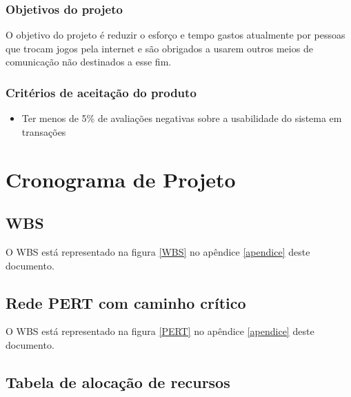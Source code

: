 \documentclass[a4paper,11pt]{article}
\begin{document}
		\subsubsection{Objetivos do projeto}
			O objetivo do projeto é reduzir o esforço e tempo gastos atualmente por pessoas que trocam jogos pela internet e são obrigados a usarem outros meios de comunicação não destinados a esse fim.
			
		\subsubsection{Critérios de aceitação do produto}
			\begin{itemize}
				\item Ter menos de 5\% de avaliações negativas sobre a usabilidade do sistema em transações
			\end{itemize}
	
\section{Cronograma de Projeto}
	\subsection{WBS}
    	O WBS está representado na figura \ref{WBS} no apêndice \ref{apendice} deste documento.
	\subsection{Rede PERT com caminho crítico}
		O WBS está representado na figura \ref{PERT} no apêndice \ref{apendice} deste documento.
	\subsection{Tabela de alocação de recursos}
\end{document}

